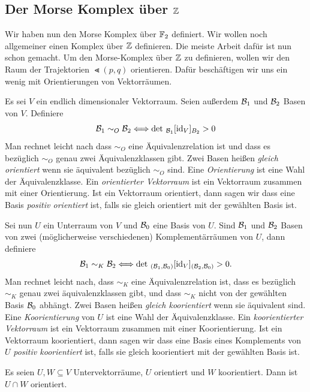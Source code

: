 \subsection*{Der Morse Komplex über \texorpdfstring{${ \mathbb Z }$}{TEXT}}

Wir haben nun den Morse Komplex über ${ \mathbb F }_2$ definiert. Wir wollen noch allgemeiner einen Komplex
über ${ \mathbb Z }$ definieren. Die meiste Arbeit dafür ist nun schon gemacht. Um den Morse-Komplex über 
${ \mathbb Z }$ zu definieren, wollen wir den Raum der Trajektorien $\Lt (p, q)$ orientieren. Dafür beschäftigen 
wir uns ein wenig mit Orientierungen von Vektorräumen.

\begin{definition}
    Es sei $V$ ein endlich dimensionaler Vektorraum. Seien außerdem $\mathcal{B}_1$ und $\mathcal{B}_2$ Basen von $V$. 
    Definiere
    \[ \mathcal{B}_1 \sim_O \mathcal{B}_2 \Longleftrightarrow \det \, _{\mathcal{B}_1}[{ \operatorname{id} }_V]_{B_2} > 0 \]
    Man rechnet leicht nach dass $\sim_O$ eine Äquivalenzrelation ist und dass es bezüglich $\sim_O$
    genau zwei Äquivalenzklassen gibt.
    Zwei Basen heißen \textit{gleich orientiert} wenn sie äquivalent bezüglich $\sim_O$ sind. 
    Eine \textit{Orientierung} ist eine Wahl der Äquivalenzklasse. Ein \textit{orientierter Vektorraum} 
    ist ein Vektorraum zusammen mit einer Orientierung. Ist ein Vektorraum orientiert, dann sagen wir 
    dass eine Basis \textit{positiv orientiert} ist, falls sie gleich orientiert mit der gewählten Basis 
    ist.

    Sei nun $U$ ein Unterraum von $V$ und $\mathcal{B}_0$ eine Basis von $U$. Sind $\mathcal{B}_1$ und $\mathcal{B}_2$ Basen von 
    zwei (möglicherweise verschiedenen) Komplementärräumen von $U$, dann definiere
    \[ \mathcal{B}_1 \sim_K \mathcal{B}_2 \Longleftrightarrow \det \, _{(\mathcal{B}_1, \mathcal{B}_0)}[{ \operatorname{id} }_V]_{(\mathcal{B}_2, \mathcal{B}_0)} > 0 . \]
    Man rechnet leicht nach, dass $\sim_K$ eine Äquivalenzrelation ist, dass es bezüglich $\sim_K$
    genau zwei äquivalenzklassen gibt, und dass $\sim_K$ nicht von der gewählten Basis $\mathcal{B}_0$ abhängt. 
    Zwei Basen heißen \textit{gleich koorientiert} wenn sie äquivalent sind. Eine \textit{Koorientierung} 
    von $U$ ist eine Wahl der Äquivalenzklasse. Ein \textit{koorientierter Vektorraum} ist ein Vektorraum 
    zusammen mit einer Koorientierung. Ist ein Vektorraum koorientiert, dann sagen wir dass eine Basis 
    eines Komplements von $U$ \textit{positiv koorientiert} ist, falls sie gleich koorientiert mit der 
    gewählten Basis ist.
\end{definition}

\begin{prop}
    Es seien $U, W \subseteq V$ Untervektorräume, $U$ orientiert und $W$ koorientiert. Dann ist 
    $U \cap W$ orientiert.
\end{prop}

